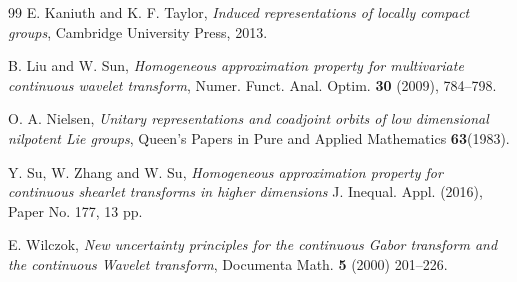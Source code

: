 \documentclass[11pt,reqno]{amsart}
\numberwithin{equation}{section}
\theoremstyle{definition}
\begin{document}
\begin{thebibliography}{99}
 E. Kaniuth and K. F. Taylor, \textit{Induced representations of locally compact groups}, Cambridge University Press, 2013.

 B. Liu and W. Sun, \textit{Homogeneous approximation property for multivariate continuous wavelet transform}, Numer. Funct. Anal. Optim. \textbf{30} (2009), 784--798. 

 O. A. Nielsen, \textit{Unitary representations and coadjoint orbits of low dimensional nilpotent Lie groups}, Queen's Papers in Pure and Applied Mathematics \textbf{63}(1983).  

 Y. Su, W. Zhang and W. Su, \textit{Homogeneous approximation property for continuous shearlet transforms in higher dimensions} J. Inequal. Appl. (2016), Paper No. 177, 13 pp.

 E. Wilczok, \textit{New uncertainty principles for the continuous Gabor transform and the continuous Wavelet transform}, Documenta Math. \textbf{5} (2000) 201--226.

\end{thebibliography}
\end{document}
